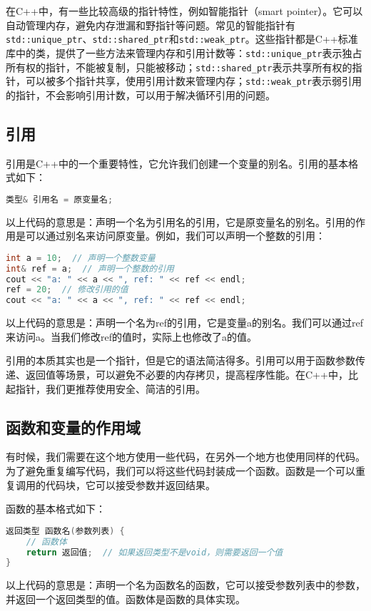 在C++中，有一些比较高级的指针特性，例如智能指针（smart pointer）。它可以自动管理内存，避免内存泄漏和野指针等问题。常见的智能指针有\texttt{std::unique\_ptr}、\texttt{std::shared\_ptr}和\texttt{std::weak\_ptr}。这些指针都是C++标准库中的类，提供了一些方法来管理内存和引用计数等：\texttt{std::unique\_ptr}表示独占所有权的指针，不能被复制，只能被移动；\texttt{std::shared\_ptr}表示共享所有权的指针，可以被多个指针共享，使用引用计数来管理内存；\texttt{std::weak\_ptr}表示弱引用的指针，不会影响引用计数，可以用于解决循环引用的问题。

\subsection{引用}

引用是C++中的一个重要特性，它允许我们创建一个变量的别名。引用的基本格式如下：
\begin{lstlisting}[language=C++]
类型& 引用名 = 原变量名;
\end{lstlisting}
以上代码的意思是：声明一个名为引用名的引用，它是原变量名的别名。引用的作用是可以通过别名来访问原变量。例如，我们可以声明一个整数的引用：
\begin{lstlisting}[language=C++]
int a = 10;  // 声明一个整数变量
int& ref = a;  // 声明一个整数的引用
cout << "a: " << a << ", ref: " << ref << endl;
ref = 20;  // 修改引用的值
cout << "a: " << a << ", ref: " << ref << endl;
\end{lstlisting}

以上代码的意思是：声明一个名为ref的引用，它是变量a的别名。我们可以通过ref来访问a。当我们修改ref的值时，实际上也修改了a的值。

引用的本质其实也是一个指针，但是它的语法简洁得多。引用可以用于函数参数传递、返回值等场景，可以避免不必要的内存拷贝，提高程序性能。在C++中，比起指针，我们更推荐使用安全、简洁的引用。

\subsection{函数和变量的作用域}

有时候，我们需要在这个地方使用一些代码，在另外一个地方也使用同样的代码。为了避免重复编写代码，我们可以将这些代码封装成一个函数。函数是一个可以重复调用的代码块，它可以接受参数并返回结果。

函数的基本格式如下：
\begin{lstlisting}[language=C++]
返回类型 函数名(参数列表) {
    // 函数体
    return 返回值;  // 如果返回类型不是void，则需要返回一个值
}
\end{lstlisting}
以上代码的意思是：声明一个名为函数名的函数，它可以接受参数列表中的参数，并返回一个返回类型的值。函数体是函数的具体实现。


